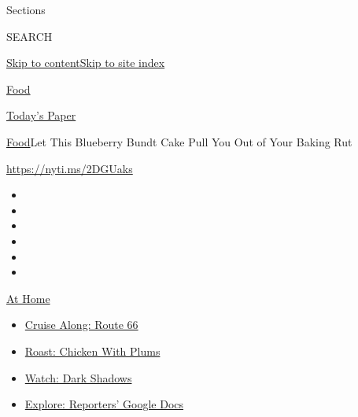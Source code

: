 Sections

SEARCH

\protect\hyperlink{site-content}{Skip to
content}\protect\hyperlink{site-index}{Skip to site index}

\href{https://www.nytimes3xbfgragh.onion/section/food}{Food}

\href{https://myaccount.nytimes3xbfgragh.onion/auth/login?response_type=cookie\&client_id=vi}{}

\href{https://www.nytimes3xbfgragh.onion/section/todayspaper}{Today's
Paper}

\href{/section/food}{Food}\textbar{}Let This Blueberry Bundt Cake Pull
You Out of Your Baking Rut

\url{https://nyti.ms/2DGUaks}

\begin{itemize}
\item
\item
\item
\item
\item
\item
\end{itemize}

\href{https://www.nytimes3xbfgragh.onion/spotlight/at-home?action=click\&pgtype=Article\&state=default\&region=TOP_BANNER\&context=at_home_menu}{At
Home}

\begin{itemize}
\tightlist
\item
  \href{https://www.nytimes3xbfgragh.onion/2020/09/07/travel/route-66.html?action=click\&pgtype=Article\&state=default\&region=TOP_BANNER\&context=at_home_menu}{Cruise
  Along: Route 66}
\item
  \href{https://www.nytimes3xbfgragh.onion/2020/09/04/dining/sheet-pan-chicken.html?action=click\&pgtype=Article\&state=default\&region=TOP_BANNER\&context=at_home_menu}{Roast:
  Chicken With Plums}
\item
  \href{https://www.nytimes3xbfgragh.onion/2020/09/04/arts/television/dark-shadows-stream.html?action=click\&pgtype=Article\&state=default\&region=TOP_BANNER\&context=at_home_menu}{Watch:
  Dark Shadows}
\item
  \href{https://www.nytimes3xbfgragh.onion/interactive/2020/at-home/even-more-reporters-editors-diaries-lists-recommendations.html?action=click\&pgtype=Article\&state=default\&region=TOP_BANNER\&context=at_home_menu}{Explore:
  Reporters' Google Docs}
\end{itemize}

